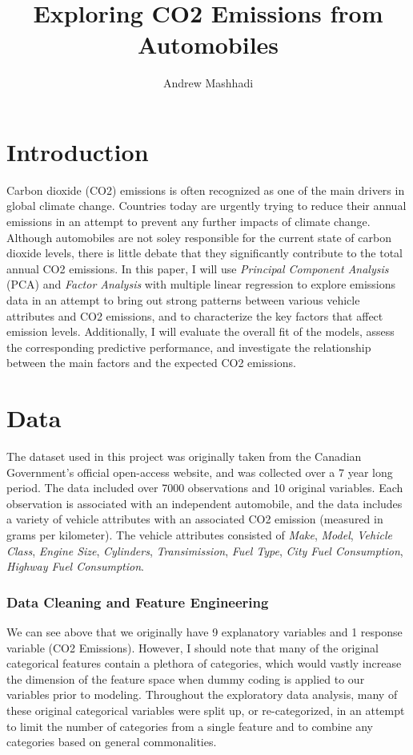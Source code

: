 \documentclass[11pt]{article}
\title{\vspace{-1cm}Exploring CO2 Emissions from Automobiles}
\author{Andrew Mashhadi}
\date{}
\begin{document}
\maketitle
\section*{Introduction}

Carbon dioxide (CO2) emissions is often recognized as one of the main drivers in global climate change. Countries today are urgently trying to reduce their annual emissions in an attempt to prevent any further impacts of climate change. Although automobiles are not soley responsible for the current state of carbon dioxide levels, there is little debate that they significantly contribute to the total annual CO2 emissions. In this paper, I will use \textit{Principal Component Analysis} (PCA) and \textit{Factor Analysis} with multiple linear regression to explore emissions data in an attempt to bring out strong patterns between various vehicle attributes and CO2 emissions, and to characterize the key factors that affect emission levels. Additionally, I will evaluate the overall fit of the models, assess the corresponding predictive performance, and investigate the relationship between the main factors and the expected CO2 emissions.


\section*{Data}

The dataset \cite{co2data} used in this project was originally taken from the Canadian Government's official open-access website, and was collected over a 7 year long period. The data included over 7000 observations and 10 original variables. Each observation is associated with an independent automobile, and the data includes a variety of vehicle attributes with an associated CO2 emission (measured in grams per kilometer). The vehicle attributes consisted of \textit{Make}, \textit{Model}, \textit{Vehicle Class}, \textit{Engine Size}, \textit{Cylinders}, \textit{Transimission}, \textit{Fuel Type}, \textit{City Fuel Consumption}, \textit{Highway Fuel Consumption}. 

\subsubsection*{Data Cleaning and Feature Engineering}

We can see above that we originally have 9 explanatory variables and 1 response variable (CO2 Emissions). However, I should note that many of the original categorical features contain a plethora of categories, which would vastly increase the dimension of the feature space when dummy coding is applied to our variables prior to modeling. Throughout the exploratory data analysis, many of these original categorical variables were split up, or re-categorized, in an attempt to limit the number of categories from a single feature and to combine any categories based on general commonalities.
\end{document}
